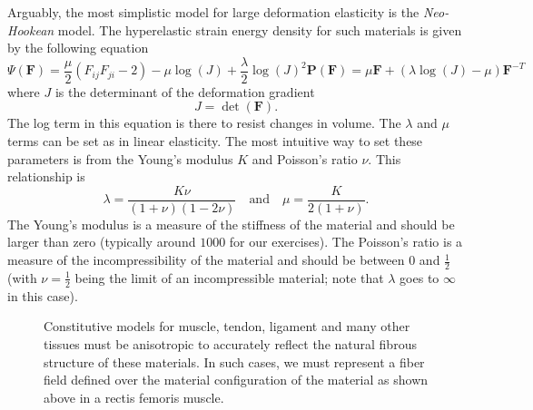Arguably, the most simplistic model for large deformation elasticity is the \emph{Neo-Hookean} model. The hyperelastic strain energy density for such materials is given by the following equation
\begin{subequations}
\begin{equation*}
\Psi \left( \mathbf{F} \right) = \frac{\mu}{2} \left( F_{ij} F_{ji} - 2 \right) - \mu \log(J) + \frac{\lambda}{2} \log(J)^2
\end{equation*}
\begin{equation*}
\mathbf{P} \left( \mathbf{F} \right) = \mu \mathbf{F} + \left( \lambda \log(J) - \mu \right) \mathbf{F}^{-T}
\end{equation*}
\end{subequations}
where  $J$ is the determinant of the deformation gradient
\begin{equation*}
J = \det \left( \mathbf{F} \right).
\end{equation*}
The log term in this equation is there to resist changes in volume. The $\lambda$ and $\mu$ terms can be set as in linear elasticity. The most intuitive way to set these parameters is from the Young's modulus $K$ and Poisson's ratio $\nu$. This relationship is
\begin{equation*}
\lambda = \frac{K \nu}{(1 + \nu)(1 - 2\nu)} \quad \text{and} \quad \mu = \frac{K}{2 (1 + \nu)}.
\end{equation*}
The Young's modulus is a measure of the stiffness of the material and should be larger than zero (typically around $1000$ for our exercises). The Poisson's ratio is a measure of the incompressibility of the material and should be between 0 and $\frac{1}{2}$ (with $\nu = \frac{1}{2}$ being the limit of an incompressible material; note that $\lambda$ goes to $\infty$ in this case).

\begin{figure}
\caption{Constitutive models for muscle, tendon, ligament and many other tissues must be anisotropic to accurately reflect the natural fibrous structure of these materials. In such cases, we must represent a fiber field defined over the material configuration of the material as shown above in a rectis femoris muscle.}
\label{fig:fibers}
\end{figure}

